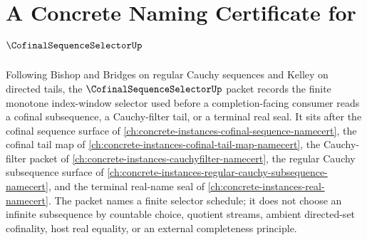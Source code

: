 \chapter{A Concrete Naming Certificate for $\CofinalSequenceSelectorUp$}
\label{ch:concrete-instances-cofinal-sequence-selector-namecert}

Following Bishop and Bridges on regular Cauchy sequences and Kelley on directed tails, the $\CofinalSequenceSelectorUp$ packet records the finite monotone index-window selector used before a completion-facing consumer reads a cofinal subsequence, a Cauchy-filter tail, or a terminal real seal. It sits after the cofinal sequence surface of \autoref{ch:concrete-instances-cofinal-sequence-namecert}, the cofinal tail map of \autoref{ch:concrete-instances-cofinal-tail-map-namecert}, the Cauchy-filter packet of \autoref{ch:concrete-instances-cauchyfilter-namecert}, the regular Cauchy subsequence surface of \autoref{ch:concrete-instances-regular-cauchy-subsequence-namecert}, and the terminal real-name seal of \autoref{ch:concrete-instances-real-namecert}. The packet names a finite selector schedule; it does not choose an infinite subsequence by countable choice, quotient streams, ambient directed-set cofinality, host real equality, or an external completeness principle.

